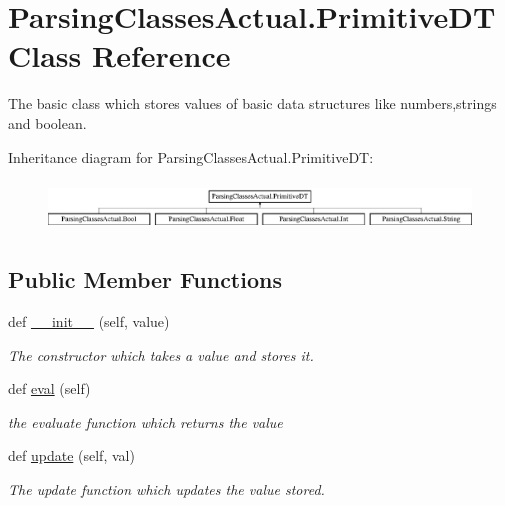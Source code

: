 \hypertarget{class_parsing_classes_actual_1_1_primitive_d_t}{}\section{Parsing\+Classes\+Actual.\+Primitive\+DT Class Reference}
\label{class_parsing_classes_actual_1_1_primitive_d_t}


The basic class which stores values of basic data structures like numbers,strings and boolean.  


Inheritance diagram for Parsing\+Classes\+Actual.\+Primitive\+DT\+:\begin{figure}[H]
\begin{center}
\leavevmode
\includegraphics[height=1.327014cm]{class_parsing_classes_actual_1_1_primitive_d_t}
\end{center}
\end{figure}
\subsection*{Public Member Functions}
\begin{DoxyCompactItemize}
\item 
def \hyperlink{class_parsing_classes_actual_1_1_primitive_d_t_a2304320d29f6a8dc8ae980daf77f2f05}{\+\_\+\+\_\+init\+\_\+\+\_\+} (self, value)\hypertarget{class_parsing_classes_actual_1_1_primitive_d_t_a2304320d29f6a8dc8ae980daf77f2f05}{}\label{class_parsing_classes_actual_1_1_primitive_d_t_a2304320d29f6a8dc8ae980daf77f2f05}

\begin{DoxyCompactList}\small\item\em The constructor which takes a value and stores it. \end{DoxyCompactList}\item 
def \hyperlink{class_parsing_classes_actual_1_1_primitive_d_t_a39857bf656def22c6270a26804e1d7aa}{eval} (self)\hypertarget{class_parsing_classes_actual_1_1_primitive_d_t_a39857bf656def22c6270a26804e1d7aa}{}\label{class_parsing_classes_actual_1_1_primitive_d_t_a39857bf656def22c6270a26804e1d7aa}

\begin{DoxyCompactList}\small\item\em the evaluate function which returns the value \end{DoxyCompactList}\item 
def \hyperlink{class_parsing_classes_actual_1_1_primitive_d_t_ac6dd10edd29b85354b53ad165f5704d1}{update} (self, val)
\begin{DoxyCompactList}\small\item\em The update function which updates the value stored. \end{DoxyCompactList}\end{DoxyCompactItemize}
